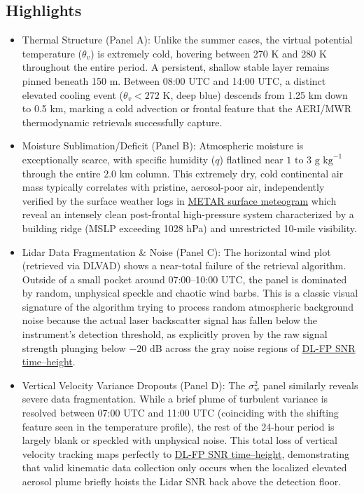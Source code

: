 \documentclass[11pt]{article}
\begin{document}
\subsection*{Highlights}
\begin{itemize}
  \item Thermal Structure (Panel A): Unlike the summer cases, the virtual potential temperature ($\theta_v$) is extremely cold, hovering between 270 K and 280 K throughout the entire period. A persistent, shallow stable layer remains pinned beneath 150 m. Between 08:00 UTC and 14:00 UTC, a distinct elevated cooling event ($\theta_v < 272\text{ K}$, deep blue) descends from 1.25 km down to 0.5 km, marking a cold advection or frontal feature that the AERI/MWR thermodynamic retrievals successfully capture.
  \item Moisture Sublimation/Deficit (Panel B): Atmospheric moisture is exceptionally scarce, with specific humidity ($q$) flatlined near $1\text{ to }3\text{ g kg}^{-1}$ through the entire 2.0 km column. This extremely dry, cold continental air mass typically correlates with pristine, aerosol-poor air, independently verified by the surface weather logs in \hyperref[fig:stable_bad_dl_c1:stable_bad_dl_c1_aux_metar_meteogram]{METAR surface meteogram} which reveal an intensely clean post-frontal high-pressure system characterized by a building ridge (MSLP exceeding 1028 hPa) and unrestricted 10-mile visibility.
  \item Lidar Data Fragmentation \& Noise (Panel C): The horizontal wind plot (retrieved via DLVAD) shows a near-total failure of the retrieval algorithm. Outside of a small pocket around 07:00–10:00 UTC, the panel is dominated by random, unphysical speckle and chaotic wind barbs. This is a classic visual signature of the algorithm trying to process random atmospheric background noise because the actual laser backscatter signal has fallen below the instrument's detection threshold, as explicitly proven by the raw signal strength plunging below $-20\text{ dB}$ across the gray noise regions of \hyperref[fig:stable_bad_dl_c1:stable_bad_dl_c1_aux_dlfp_snr_timeheight]{DL-FP SNR time–height}.
  \item Vertical Velocity Variance Dropouts (Panel D): The $\sigma_w^2$ panel similarly reveals severe data fragmentation. While a brief plume of turbulent variance is resolved between 07:00 UTC and 11:00 UTC (coinciding with the shifting feature seen in the temperature profile), the rest of the 24-hour period is largely blank or speckled with unphysical noise. This total loss of vertical velocity tracking maps perfectly to \hyperref[fig:stable_bad_dl_c1:stable_bad_dl_c1_aux_dlfp_snr_timeheight]{DL-FP SNR time–height}, demonstrating that valid kinematic data collection only occurs when the localized elevated aerosol plume briefly hoists the Lidar SNR back above the detection floor.
\end{itemize}
\end{document}
